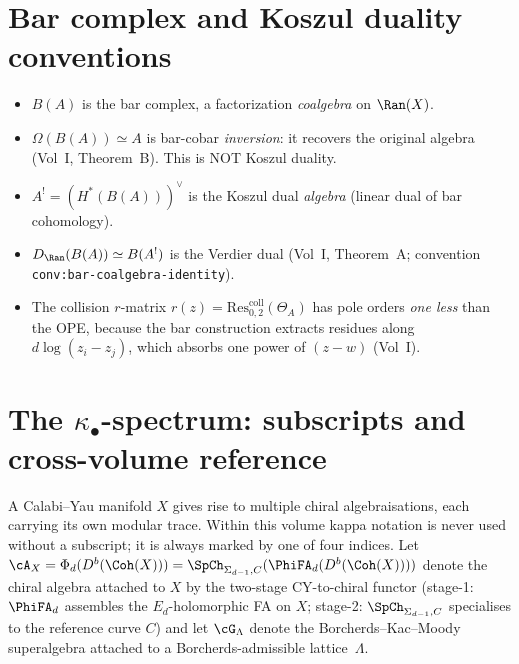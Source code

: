 \section{Bar complex and Koszul duality conventions}
\label{sec:bar-koszul-conventions}

\begin{itemize}
 \item $B(A)$ is the bar complex, a factorization \emph{coalgebra} on $\Ran(X)$.
 \item $\Omega(B(A)) \simeq A$ is bar-cobar \emph{inversion}: it recovers the
 original algebra (Vol~I, Theorem~B). This is NOT Koszul duality.
 \item $A^! = (H^*(B(A)))^\vee$ is the Koszul dual \emph{algebra} (linear
 dual of bar cohomology).
 \item $D_{\Ran}(B(A)) \simeq B(A^!)$ is the Verdier dual
 \textup{(}Vol~I, Theorem~A; convention
 \texttt{conv:bar-coalgebra-identity}\textup{).}
 \item The collision $r$-matrix
 $r(z) = \mathrm{Res}^{\mathrm{coll}}_{0,2}(\Theta_A)$ has pole orders
 \emph{one less} than the OPE, because the bar construction extracts
 residues along $d\log(z_i - z_j)$, which absorbs one power of
 $(z - w)$ (Vol~I).
\end{itemize}


\section{The \texorpdfstring{$\kappa_\bullet$}{kappa-bullet}-spectrum: subscripts and cross-volume reference}
\label{sec:kappa-spectrum}

A Calabi--Yau manifold $X$ gives rise to multiple chiral algebraisations,
each carrying its own modular trace. Within this volume kappa notation
is never used without a subscript; it is always marked by one of four
indices. Let $\cA_X = \Phi_d(D^b(\Coh(X))) = \SpCh_{\Sigma_{d-1},C}(\PhiFA_d(D^b(\Coh(X))))$
denote the chiral algebra attached to $X$ by the two-stage CY-to-chiral
functor (stage-1: $\PhiFA_d$ assembles the $E_d$-holomorphic FA on $X$;
stage-2: $\SpCh_{\Sigma_{d-1},C}$ specialises to the reference curve $C$)
and let $\cG_{\Lambda}$ denote
the Borcherds--Kac--Moody superalgebra attached to a Borcherds-admissible
lattice~$\Lambda$.

